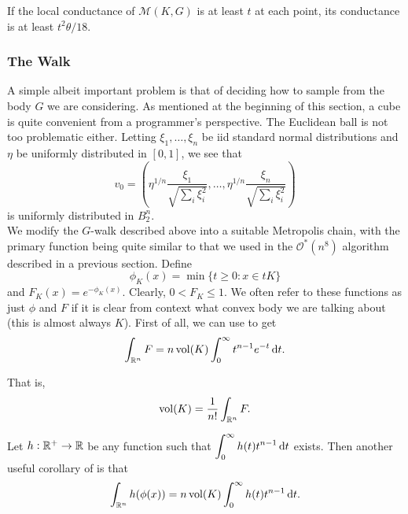 \begin{corollary}
	\label{cor to bound conductance}
	If the local conductance of $\mathcal{M}(K,G)$ is at least $t$ at each point, its conductance is at least $t^2\theta/18$.
\end{corollary}

\subsubsection{The Walk}
\label{the walk}

A simple albeit important problem is that of deciding how to sample from the body $G$ we are considering. As mentioned at the beginning of this section, a cube is quite convenient from a programmer's perspective. The Euclidean ball is not too problematic either. Letting $\xi_1,\ldots,\xi_n$ be iid standard normal distributions and $\eta$ be uniformly distributed in $[0,1]$, we see that
\[ v_0 = \left( \eta^{1/n} \frac{\xi_1}{\sqrt{\sum_i \xi_i^2}}, \ldots, \eta^{1/n} \frac{\xi_n}{\sqrt{\sum_i \xi_i^2}} \right) \]
is uniformly distributed in $B_2^n$.\\

We modify the $G$-walk described above into a suitable Metropolis chain, with the primary function being quite similar to that we used in the $\mathcal{O}^*(n^8)$ algorithm described in a previous section. Define
\[ \phi_K(x) = \min\{t\geq 0 : x\in tK\} \]
and $F_K(x)=e^{-\phi_K(x)}$. Clearly, $0<F_K \leq 1$. We often refer to these functions as just $\phi$ and $F$ if it is clear from context what convex body we are talking about (this is almost always $K$). First of all, we can use  to get
\[ \int_{\mathbb{R}^n} F = n\operatorname{vol}(K)\int_0^\infty t^{n-1}e^{-t}\operatorname{d}\!{t}. \]

That is,
\begin{equation}
	\operatorname{vol}(K) = \frac{1}{n!} \int_{\mathbb{R}^n} F.
\end{equation}

Let $h:\mathbb{R}^+\to\mathbb{R}$ be any function such that $\displaystyle\int_0^\infty h(t)t^{n-1}\operatorname{d}\!{t}$ exists. Then another useful corollary of  is that
\begin{equation}
	\label{eqn: 4.20}
	\int_{\mathbb{R}^n} h(\phi(x)) = n\operatorname{vol}(K)\int_0^\infty h(t)t^{n-1}\operatorname{d}\!{t}.
\end{equation}



